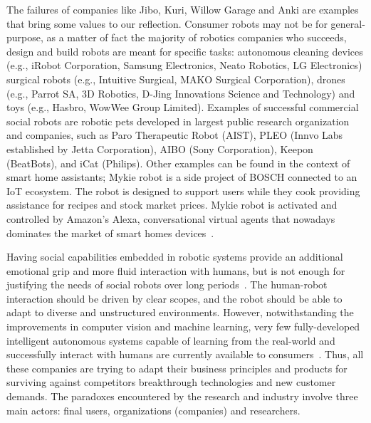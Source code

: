 \documentclass[11pt,a4paper]{report}
\begin{document}
The failures of companies like Jibo, Kuri, Willow Garage and Anki are examples
that bring some values to our reflection. Consumer robots may not be for
general-purpose, as a matter of fact the majority of robotics companies who
succeeds, design and build robots are meant for specific tasks: autonomous
cleaning devices (e.g., iRobot Corporation, Samsung Electronics, Neato Robotics,
LG Electronics) surgical robots (e.g., Intuitive Surgical, MAKO Surgical
Corporation), drones (e.g., Parrot SA, 3D Robotics, D-Jing Innovations Science
and Technology) and toys (e.g., Hasbro, WowWee Group Limited).  Examples of
successful commercial social robots are robotic pets developed in largest public
research organization and companies, such as Paro Therapeutic Robot (AIST), PLEO
(Innvo Labs established by Jetta Corporation), AIBO (Sony Corporation), Keepon
(BeatBots), and iCat (Philips).  Other examples can be found in the context of
smart home assistants; Mykie robot is a side project of BOSCH connected to an
IoT ecosystem. The robot is designed to support users while they cook providing
assistance for recipes and stock market prices. Mykie robot is activated and
controlled by Amazon’s Alexa, conversational virtual agents that nowadays
dominates the market of smart homes devices~\cite{purington2017alexa,
sciuto2018hey}.

Having social capabilities embedded in robotic systems provide an additional
emotional grip and more fluid interaction with humans, but is not enough for
justifying the needs of social robots over long periods~\cite{leite2013social,
baraka2019extended}. The human-robot interaction should be driven by clear
scopes, and the robot should be able to adapt to diverse and unstructured
environments. However, notwithstanding the improvements in computer vision and
machine learning, very few fully-developed intelligent autonomous systems
capable of learning from the real-world and successfully interact with humans
are currently available to consumers~\cite{dereshev2019longterm}. Thus, all
these companies are trying to adapt their business principles and products for
surviving against competitors breakthrough technologies and new customer
demands. The paradoxes encountered by the research and industry involve three
main actors: final users, organizations (companies) and researchers.

~\cite{tulli2019great}
~\cite{hoffman2019anki}
\end{document}

